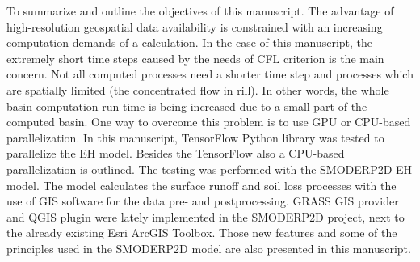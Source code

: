 To summarize and outline the objectives of this manuscript. The advantage of high-resolution
geospatial data availability is constrained with an increasing computation demands
of a calculation. In the case of this manuscript, the extremely 
short time steps caused by the needs of CFL criterion is the main concern. 
Not all computed processes need a shorter time step and processes which are spatially limited (the concentrated flow in rill). 
In other words, 
the whole basin computation run-time is being increased due to a small part
of the computed basin. One way to overcome this problem is to use 
GPU or CPU-based parallelization. In this manuscript, TensorFlow Python library 
\cite{tensorflow2015-whitepaper} was tested to parallelize the EH model. 
Besides the TensorFlow also a CPU-based parallelization is outlined. 
The testing was performed with the SMODERP2D EH model. The model calculates the surface runoff
and soil loss processes with the use of GIS software for the data pre- and postprocessing. 
GRASS GIS provider and QGIS plugin were lately implemented in the SMODERP2D project, next to the already existing Esri ArcGIS Toolbox. 
Those new features and some of the principles used in the SMODERP2D model are also presented in this manuscript. 

